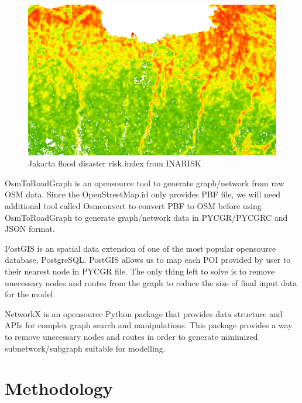 \documentclass[conference]{IEEEtran}
\begin{document}
\begin{figure}
\centerline{\includegraphics[scale=0.3]{jakarta_flood_risk_layer_inarisk.png}}
\caption{Jakarta flood disaster risk index from INARISK}
\label{fig_jakarta_flood_risk_layer_inarisk}
\end{figure}

OsmToRoadGraph\cite{Gemsa2017OsmToRoadGraph} is an opensource tool to generate graph/network from raw OSM data. Since the OpenStreetMap.id only provides PBF file, we will need additional tool called Osmconvert\cite{OpenStreetMap2019OsmConvert} to convert PBF to OSM before using OsmToRoadGraph to generate graph/network data in PYCGR/PYCGRC and JSON format.

PostGIS\cite{postgis2019postgis} is an spatial data extension of one of the most popular opensource database, PostgreSQL\cite{postgresql1996postgresql}. PostGIS allows us to map each POI provided by user to their nearest node in PYCGR file. The only thing left to solve is to remove unecessary nodes and routes from the graph to reduce the size of final input data for the model.

NetworkX\cite{SciPyProceedings_11} is an opensource Python package that provides data structure and APIs for complex graph search and manipulations. This package provides a way to remove unecessary nodes and routes in order to generate minimized subnetwork/subgraph suitable for modelling.


\section{Methodology}
\end{document}
